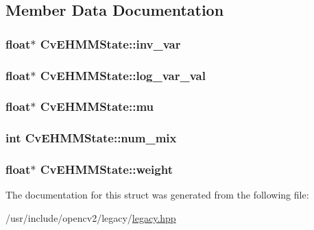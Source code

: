 \subsection{Member Data Documentation}
\hypertarget{structCvEHMMState_adcb09e6a57bb8b6c06ced06629ea7fa2}{
\subsubsection[{inv\-\_\-var}]{\setlength{\rightskip}{0pt plus 5cm}float$\ast$ Cv\-E\-H\-M\-M\-State\-::inv\-\_\-var}}\label{structCvEHMMState_adcb09e6a57bb8b6c06ced06629ea7fa2}
\hypertarget{structCvEHMMState_a9cd99f55e789424d88d2283e9ec89daf}{
\subsubsection[{log\-\_\-var\-\_\-val}]{\setlength{\rightskip}{0pt plus 5cm}float$\ast$ Cv\-E\-H\-M\-M\-State\-::log\-\_\-var\-\_\-val}}\label{structCvEHMMState_a9cd99f55e789424d88d2283e9ec89daf}
\hypertarget{structCvEHMMState_a993c9aa34c4de69c40af0c0e6b2d3f2c}{
\subsubsection[{mu}]{\setlength{\rightskip}{0pt plus 5cm}float$\ast$ Cv\-E\-H\-M\-M\-State\-::mu}}\label{structCvEHMMState_a993c9aa34c4de69c40af0c0e6b2d3f2c}
\hypertarget{structCvEHMMState_adfda6047de059d4f4cad1f8ed2b36a29}{
\subsubsection[{num\-\_\-mix}]{\setlength{\rightskip}{0pt plus 5cm}int Cv\-E\-H\-M\-M\-State\-::num\-\_\-mix}}\label{structCvEHMMState_adfda6047de059d4f4cad1f8ed2b36a29}
\hypertarget{structCvEHMMState_a3bb5cefe04096511d309bf6da477dbed}{
\subsubsection[{weight}]{\setlength{\rightskip}{0pt plus 5cm}float$\ast$ Cv\-E\-H\-M\-M\-State\-::weight}}\label{structCvEHMMState_a3bb5cefe04096511d309bf6da477dbed}


The documentation for this struct was generated from the following file\-:\begin{DoxyCompactItemize}
\item 
/usr/include/opencv2/legacy/\hyperlink{legacy_8hpp}{legacy.\-hpp}\end{DoxyCompactItemize}
